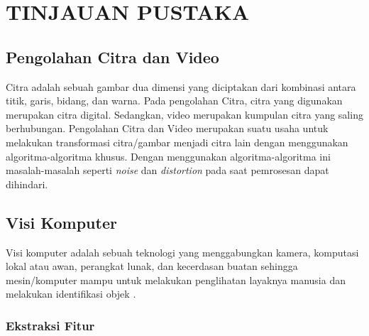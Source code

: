 \chapter{TINJAUAN PUSTAKA}


\section{Pengolahan Citra dan Video}


Citra adalah sebuah gambar dua dimensi yang diciptakan dari kombinasi antara titik, garis, bidang, dan warna.
Pada pengolahan Citra, citra yang digunakan merupakan citra digital.
Sedangkan, video merupakan kumpulan citra yang saling berhubungan.
Pengolahan Citra dan Video merupakan suatu usaha untuk melakukan transformasi citra/gambar menjadi citra lain dengan menggunakan algoritma-algoritma khusus.
Dengan menggunakan algoritma-algoritma ini masalah-masalah seperti \textit{noise} dan \textit{distortion} pada saat pemrosesan dapat dihindari.


\section{Visi Komputer}

Visi komputer adalah sebuah teknologi yang menggabungkan kamera, komputasi lokal atau awan, perangkat lunak, dan kecerdasan buatan sehingga mesin/komputer mampu untuk melakukan penglihatan layaknya manusia dan melakukan identifikasi objek \cite{vision}.

  \subsection{Ekstraksi Fitur}

